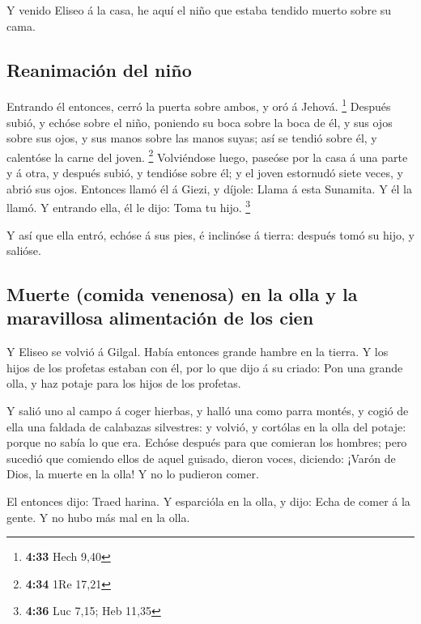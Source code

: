  Y venido Eliseo á la casa, he aquí el niño que estaba
tendido muerto sobre su cama.

\hypertarget{reanimaciuxf3n-del-niuxf1o}{%
\subsection{Reanimación del niño}\label{reanimaciuxf3n-del-niuxf1o}}

 Entrando él entonces, cerró la puerta sobre ambos, y oró á
Jehová. \footnote{\textbf{4:33} Hech 9,40}  Después subió,
y echóse sobre el niño, poniendo su boca sobre la boca de él, y sus ojos
sobre sus ojos, y sus manos sobre las manos suyas; así se tendió sobre
él, y calentóse la carne del joven. \footnote{\textbf{4:34} 1Re 17,21}
 Volviéndose luego, paseóse por la casa á una parte y á
otra, y después subió, y tendióse sobre él; y el joven estornudó siete
veces, y abrió sus ojos.  Entonces llamó él á Giezi, y
díjole: Llama á esta Sunamita. Y él la llamó. Y entrando ella, él le
dijo: Toma tu hijo. \footnote{\textbf{4:36} Luc 7,15; Heb 11,35}

 Y así que ella entró, echóse á sus pies, é inclinóse á
tierra: después tomó su hijo, y salióse.

\hypertarget{muerte-comida-venenosa-en-la-olla-y-la-maravillosa-alimentaciuxf3n-de-los-cien}{%
\subsection{Muerte (comida venenosa) en la olla y la maravillosa
alimentación de los
cien}\label{muerte-comida-venenosa-en-la-olla-y-la-maravillosa-alimentaciuxf3n-de-los-cien}}

 Y Eliseo se volvió á Gilgal. Había entonces grande hambre
en la tierra. Y los hijos de los profetas estaban con él, por lo que
dijo á su criado: Pon una grande olla, y haz potaje para los hijos de
los profetas.

 Y salió uno al campo á coger hierbas, y halló una como
parra montés, y cogió de ella una faldada de calabazas silvestres: y
volvió, y cortólas en la olla del potaje: porque no sabía lo que era.
 Echóse después para que comieran los hombres; pero sucedió
que comiendo ellos de aquel guisado, dieron voces, diciendo: ¡Varón de
Dios, la muerte en la olla! Y no lo pudieron comer.

 El entonces dijo: Traed harina. Y esparcióla en la olla, y
dijo: Echa de comer á la gente. Y no hubo más mal en la olla.

